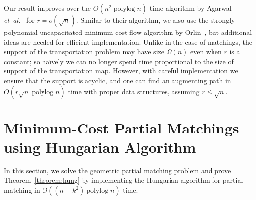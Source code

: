 \documentclass[a4paper,UKenglish]{socg-lipics-v2019}
\makeatletter
\def\etal{\emph{et~al.}}
\def\etal{\textit{et~al.}}
\def\polylog{\mathop{\mathrm{polylog}}}
\def\norm#1{\mathopen\| #1 \mathclose\|}	%
\theoremstyle{plain}
\numberwithin{figure}{section}
\def\EMPH#1{\textcolor{BrickRed}{{\emph{#1}}}}
\def\n@te#1{\textsf{\boldmath \textbf{$\langle\!\langle$#1$\rangle\!\rangle$}}\leavevmode}
\def\note#1{\textcolor{red}{\n@te{#1}}}
\makeatother
\begin{document}
Our result improves over the $O(n^2\polylog n)$ time algorithm by Agarwal
\etal~\cite{AFPVX17arxiv} for $r = o(\sqrt{n})$.
Similar to their algorithm, we also use the strongly polynomial uncapacitated
minimum-cost flow algorithm by Orlin~\cite{O93}, but additional ideas are
needed for efficient implementation.
Unlike in the case of matchings, the support of the transportation problem may
have size $\Omega(n)$ even when $r$ is a constant;
so na\"ively we can no longer spend time proportional to the size of
support of the transportation map.
However, with careful implementation we ensure that the support is acyclic,
and one can find an augmenting path in $O(r\sqrt{n} \polylog n)$ time with
proper data structures, assuming $r \leq \sqrt{n}$.


\section{Minimum-Cost Partial Matchings using Hungarian Algorithm}
\label{section:hung}

In this section, we solve the geometric partial matching problem and prove Theorem~\ref{theorem:hung} by implementing the Hungarian algorithm for partial matching in $O((n + k^2)\polylog n)$ time.


\end{document}
